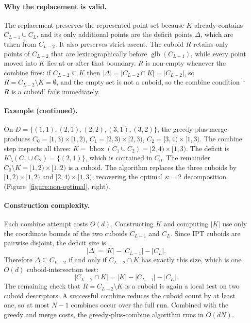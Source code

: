 \documentclass[manuscript,screen,review]{acmart}
\theoremstyle{definition}
\theoremstyle{plain}
\begin{document}
\paragraph{Why the replacement is valid.}
The replacement preserves the represented point set because $K$ already contains $C_{L-1} \cup C_L$, and its only additional points are the deficit points $\Delta$, which are taken from $C_{L-2}$. It also preserves strict ascent. The cuboid $R$ retains only points of $C_{L-2}$ that are lexicographically before $\operatorname{glb}(C_{L-1})$, while every point moved into $K$ lies at or after that boundary. $R$ is non-empty whenever the combine fires: if $C_{L-2} \subseteq K$ then $|\Delta| = |C_{L-2} \cap K| = |C_{L-2}|$, so $R = C_{L-2} \setminus K = \emptyset$, and the empty set is not a cuboid, so the combine condition~`$R$ is a cuboid' fails immediately.

\paragraph{Example (continued).}
On $D=\{(1,1),(2,1),(2,2),(3,1),(3,2)\}$, the greedy-plus-merge produces $C_0=[1,3){\times}[1,2)$, $C_1=[2,3){\times}[2,3)$, $C_2=[3,4){\times}[1,3)$. The combine step inspects all three: $K = \operatorname{bbox}(C_1 \cup C_2) = [2,4){\times}[1,3)$. The deficit is $K \setminus (C_1 \cup C_2) = \{(2,1)\}$, which is contained in $C_0$. The remainder $C_0 \setminus K = [1,2){\times}[1,2)$ is a cuboid. The algorithm replaces the three cuboids by $[1,2){\times}[1,2)$ and $[2,4){\times}[1,3)$, recovering the optimal $\kappa=2$ decomposition (Figure~\ref{figure:non-optimal}, right).

\paragraph{Construction complexity.}
Each combine attempt costs $O(d)$. Constructing $K$ and computing $|K|$ use only the coordinate bounds of the two cuboids $C_{L-1}$ and $C_L$. Since IPT cuboids are pairwise disjoint, the deficit size is
\[
  |\Delta| = |K| - |C_{L-1}| - |C_L|.
\]
Therefore $\Delta \subseteq C_{L-2}$ if and only if $C_{L-2} \cap K$ has exactly this size, which is one $O(d)$ cuboid-intersection test:
\[
  |C_{L-2} \cap K| = |K| - |C_{L-1}| - |C_L|.
\]
The remaining check that $R = C_{L-2} \setminus K$ is a cuboid is again a local test on two cuboid descriptors. A successful combine reduces the cuboid count by at least one, so at most $N-1$ combines occur over the full run. Combined with the greedy and merge costs, the greedy-plus-combine algorithm runs in $O(dN)$.
\end{document}
